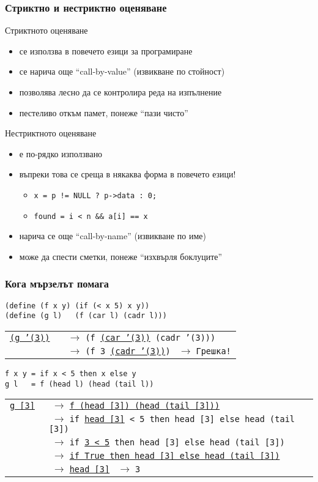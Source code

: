 \documentclass{beamer}
\begin{document}
\begin{frame}
  \frametitle{Стриктно и нестриктно оценяване}
  Стриктното оценяване
  \begin{itemize}[<+->]
  \item се използва в повечето езици за програмиране
  \item се нарича още ``call-by-value'' (извикване по стойност)
  \item позволява лесно да се контролира реда на изпълнение
  \item пестеливо откъм памет, понеже ``пази чисто''
  \end{itemize}
  \onslide<+->
  Нестриктното оценяване
  \begin{itemize}[<+->]
  \item е по-рядко използвано
  \item въпреки това се среща в някаква форма в повечето езици!
    \begin{itemize}
    \item \tt{x = p != NULL ? p->data : 0;}
    \item \tt{found = i < n \&\& a[i] == x}
    \end{itemize}
  \item нарича се още ``call-by-name'' (извикване по име)
  \item може да спести сметки, понеже ``изхвърля боклуците''
  \end{itemize}
\end{frame}

\begin{frame}[fragile]
  \frametitle{Кога мързелът помага}
  \newcommand{\lra}{$\;\rightarrow\;$}
\begin{verbatim}
(define (f x y) (if (< x 5) x y))
(define (g l)   (f (car l) (cadr l)))
\end{verbatim}
\pause
\begin{tabular}[t]{l@{}l}
\tt{\underline{(g '(3))}}
\pause
&\lra \tt{(f \underline{(car '(3))} (cadr '(3)))}\\
\pause
&\lra \tt{(f 3 \underline{(cadr '(3))})}
\pause
\lra \alert{Грешка!}
\end{tabular}
\pause
\begin{verbatim}
f x y = if x < 5 then x else y
g l   = f (head l) (head (tail l))
\end{verbatim}
\pause
\begin{tabular}[t]{l@{}l}
\tt{\underline{g [3]}}
\pause
&\lra \tt{\underline{f (head [3]) (head (tail [3]))}}\\
\pause
&\lra \tt{if \underline{head [3]} < 5 then head [3] else head (tail [3])}\\
\pause
&\lra \tt{if \underline{3 < 5} then head [3] else head (tail [3])}\\
\pause
&\lra \tt{\underline{if True then head [3] else head (tail [3])}}\\
\pause
&\lra \tt{\underline{head [3]}}
\pause
\lra \tt 3
\end{tabular}
\end{frame}
\end{document}
